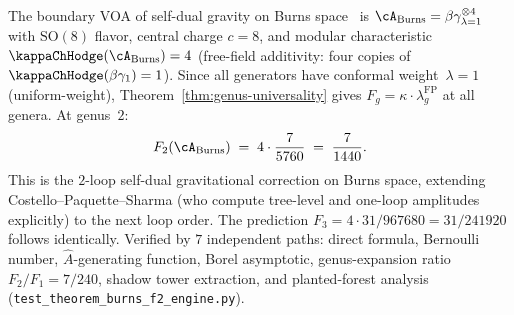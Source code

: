 \begin{remark}%
\label{rem:burns-f2-verification}%
%
%
%
The boundary VOA of self-dual gravity on Burns
space~\cite{CPS2208,CPS2306} is
$\cA_{\mathrm{Burns}} = \beta\gamma^{\otimes 4}_{\lambda=1}$
with $\mathrm{SO}(8)$ flavor, central charge $c = 8$,
and modular characteristic
$\kappaChHodge(\cA_{\mathrm{Burns}}) = 4$ (free-field additivity:
four copies of $\kappaChHodge(\beta\gamma_1) = 1$).
Since all generators have conformal weight~$\lambda = 1$
(uniform-weight), Theorem~\ref{thm:genus-universality}
gives $F_g = \kappa \cdot \lambda_g^{\mathrm{FP}}$ at
all genera. At genus~$2$:
\[
F_2(\cA_{\mathrm{Burns}})
\;=\;
4 \cdot \frac{7}{5760}
\;=\;
\frac{7}{1440}.
\]
This is the $2$-loop self-dual gravitational correction on
Burns space, extending Costello--Paquette--Sharma (who compute
tree-level and one-loop amplitudes explicitly) to the next loop
order. The prediction $F_3 = 4 \cdot 31/967680 = 31/241920$
follows identically.
Verified by $7$ independent paths: direct formula,
Bernoulli number, $\hat{A}$-generating function,
Borel asymptotic, genus-expansion ratio $F_2/F_1 = 7/240$,
shadow tower extraction, and planted-forest analysis
\textup{(}\texttt{test\_theorem\_burns\_f2\_engine.py}\textup{)}.
\end{remark}

